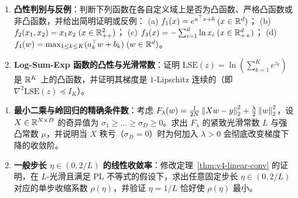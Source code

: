 \begin{enumerate}[label=\textbf{4.1.\arabic*}, leftmargin=3.3em, itemsep=5pt]
  \item\label{ex:4.1.1} \textbf{凸性判别与反例}：判断下列函数在各自定义域上是否为凸函数、严格凸函数或非凸函数，并给出简明证明或反例：
  (a) $f_1(x) = e^{a^\top x + b}\;(x\in\mathbb{R}^d)$；
  (b) $f_2(x_1, x_2) = x_1 x_2\;(x \in \mathbb{R}_{++}^2)$；
  (c) $f_3(x) = -\sum_{i=1}^d \ln x_i\;(x \in \mathbb{R}_{++}^d)$；
  (d) $f_4(w) = \max_{1\le k \le K} (a_k^\top w + b_k)\;(w\in\mathbb{R}^d)$。

  \item\label{ex:4.1.2} \textbf{Log-Sum-Exp 函数的凸性与光滑常数}：证明 $\mathrm{LSE}(z) = \ln\left(\sum_{k=1}^K e^{z_k}\right)$ 是 $\mathbb{R}^K$ 上的凸函数，并证明其梯度是 $1$-Lipschitz 连续的（即 $\nabla^2 \mathrm{LSE}(z) \preceq I_K$）。
\end{enumerate}

\begin{enumerate}[label=\textbf{4.1.\arabic*}, leftmargin=3.3em, itemsep=5pt, start=3]
  \item\label{ex:4.1.3} \textbf{最小二乘与岭回归的精确条件数}：考虑 $F_\lambda(w) = \frac{1}{2N}\left\|Xw - y\right\|_2^2 + \frac{\lambda}{2}\left\|w\right\|_2^2$，设 $X \in \mathbb{R}^{N\times D}$ 的奇异值为 $\sigma_1 \ge \dots \ge \sigma_D \ge 0$。求出 $F_\lambda$ 的紧致光滑常数 $L$ 与强凸常数 $\mu$，并说明当 $X$ 秩亏（$\sigma_D = 0$）时为何加入 $\lambda > 0$ 会彻底改变梯度下降的收敛阶。

  \item\label{ex:4.1.4} \textbf{一般步长 $\eta \in (0, 2/L)$ 的线性收敛率}：修改定理~\ref{thm:v4-linear-conv} 的证明，在 $L$-光滑且满足 PL 不等式的假设下，求出任意固定步长 $\eta \in (0, 2/L)$ 对应的单步收缩系数 $\rho(\eta)$，并验证 $\eta = 1/L$ 恰好使 $\rho(\eta)$ 最小。
\end{enumerate}

